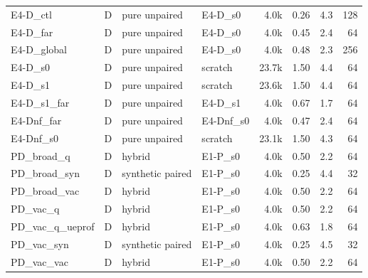 \begin{tabular}{llllrrrr}
E4-D\_ctl & D & pure unpaired & E4-D\_s0 & 4.0k & 0.26 & 4.3 & 128 \\
E4-D\_far & D & pure unpaired & E4-D\_s0 & 4.0k & 0.45 & 2.4 & 64 \\
E4-D\_global & D & pure unpaired & E4-D\_s0 & 4.0k & 0.48 & 2.3 & 256 \\
E4-D\_s0 & D & pure unpaired & scratch & 23.7k & 1.50 & 4.4 & 64 \\
E4-D\_s1 & D & pure unpaired & scratch & 23.6k & 1.50 & 4.4 & 64 \\
E4-D\_s1\_far & D & pure unpaired & E4-D\_s1 & 4.0k & 0.67 & 1.7 & 64 \\
E4-Dnf\_far & D & pure unpaired & E4-Dnf\_s0 & 4.0k & 0.47 & 2.4 & 64 \\
E4-Dnf\_s0 & D & pure unpaired & scratch & 23.1k & 1.50 & 4.3 & 64 \\
PD\_broad\_q & D & hybrid & E1-P\_s0 & 4.0k & 0.50 & 2.2 & 64 \\
PD\_broad\_syn & D & synthetic paired & E1-P\_s0 & 4.0k & 0.25 & 4.4 & 32 \\
PD\_broad\_vac & D & hybrid & E1-P\_s0 & 4.0k & 0.50 & 2.2 & 64 \\
PD\_vac\_q & D & hybrid & E1-P\_s0 & 4.0k & 0.50 & 2.2 & 64 \\
PD\_vac\_q\_ueprof & D & hybrid & E1-P\_s0 & 4.0k & 0.63 & 1.8 & 64 \\
PD\_vac\_syn & D & synthetic paired & E1-P\_s0 & 4.0k & 0.25 & 4.5 & 32 \\
PD\_vac\_vac & D & hybrid & E1-P\_s0 & 4.0k & 0.50 & 2.2 & 64 \\
\bottomrule
\end{tabular}
